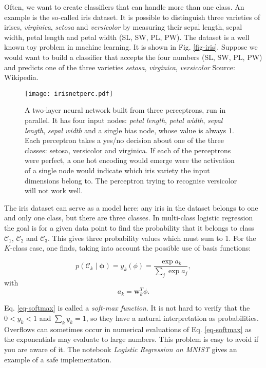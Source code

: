 \label{sec-multiclass}
  Often, we want to create classifiers that can handle more than one class. An example is the so-called iris dataset. It is possible to distinguish three varieties
  of irises, \emph{virginica}, \emph{setosa} and  \emph{versicolor} by measuring their sepal length, sepal width, petal length and petal width (SL, SW, PL, PW).
  The dataset is a well known toy problem in machine learning.
  It is shown in Fig. \ref{fig-iris}. Suppose we would want to build a classifier that accepts the four numbers (SL, SW, PL, PW) and predicts one of the three varieties
  \emph{setosa}, \emph{virginica}, \emph{versicolor} Source: Wikipedia.
  
  \begin{figure}[!ht]
    \begin{center}
      \texttt{[image: irisnetperc.pdf]}
    \end{center}
    \caption{A two-layer neural network built from three perceptrons, run in parallel. It has four input nodes: \emph{petal length}, \emph{petal width}, \emph{sepal length},
      \emph{sepal width} and a single bias node, whose value is always 1. Each perceptron takes a yes/no decision about one of the three classes: setosa,
      versicolor and virginica. If each of the perceptrons were perfect, a one hot encoding would emerge were the activation of a single node would indicate which
      iris variety the input dimensions belong to. The perceptron trying to recognise versicolor will not work well.}
    \label{eq-irisnetperc}
  \end{figure}




 The iris dataset can serve as a model here: any iris in the dataset belongs to one and only
 one class, but there are three classes. In multi-class logistic regression the goal is  for a given data point to find the probability that it belongs
 to class $\mathcal{C}_1$, $\mathcal{C}_2$ and $\mathcal{C}_3$. This gives three probability
values which must sum to 1. For the $K$-class case, one finds, taking into account the possible use of basis functions:

\begin{equation}
  p(\mathcal{C}_k \mid \boldsymbol{\phi}) = y_k(\phi) = \frac{\exp a_k}{\sum_j \exp a_j},
  \label{eq-softmax}
\end{equation}
with
$$
a_k = \boldsymbol{w}^T_k \phi.
$$

Eq. \ref{eq-softmax} is called a \emph{soft-max function}. It is not hard to verify that the $0 < y_k < 1$ and $\sum_k y_k = 1$, so they have a natural
interpretation as probabilities. Overflows can sometimes occur in numerical evaluations of Eq. \ref{eq-softmax} as the exponentials may evaluate to large
numbers. This problem is easy to avoid if you are aware of it. The notebook \emph{Logistic Regression on MNIST} gives an example of a safe implementation.

